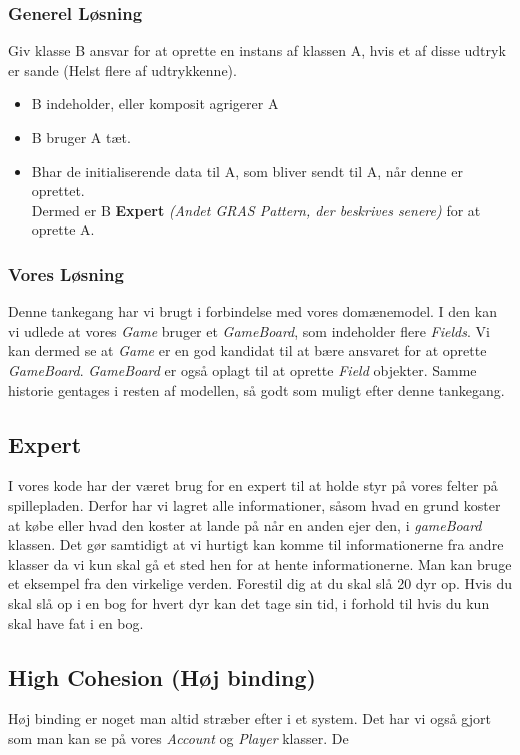 \subsubsection*{Generel Løsning}
Giv klasse B ansvar for at oprette en instans af klassen A, hvis et af disse udtryk er sande (Helst flere af udtrykkenne).
\begin{itemize}
\item B indeholder, eller komposit agrigerer A
\item B bruger A tæt.
\item Bhar de initialiserende data til A, som bliver sendt til A, når denne er oprettet.
\\
Dermed er B \textbf{Expert} \textit{(Andet GRAS Pattern, der beskrives senere)} for at oprette A.
\end{itemize}
\subsubsection*{Vores Løsning}
Denne tankegang har vi brugt i forbindelse med vores domænemodel. I den kan vi udlede at vores \textit{Game} bruger et \textit{GameBoard}, som indeholder flere \textit{Fields}. Vi kan dermed se at \textit{Game} er en god kandidat til at bære ansvaret for at oprette \textit{GameBoard}. \textit{GameBoard} er også oplagt til at oprette \textit{Field} objekter. Samme historie gentages i resten af modellen, så godt som muligt efter denne tankegang.
\subsection{Expert}
I vores kode har der været brug for en expert til at holde styr på vores felter på spillepladen. Derfor har vi lagret alle informationer, såsom hvad en grund koster at købe eller hvad den koster at lande på når en anden ejer den, i \textit{gameBoard} klassen. Det gør samtidigt at vi hurtigt kan komme til informationerne fra andre klasser da vi kun skal gå et sted hen for at hente informationerne. 
Man kan bruge et eksempel fra den virkelige verden. Forestil dig at du skal slå 20 dyr op. Hvis du skal slå op i en bog for hvert dyr kan det tage sin tid, i forhold til hvis du kun skal have fat i en bog.
\\
\subsection{High Cohesion (Høj binding)}
Høj binding er noget man altid stræber efter i et system. Det har vi også gjort som man kan se på vores \textit{Account} og \textit{Player} klasser. De
